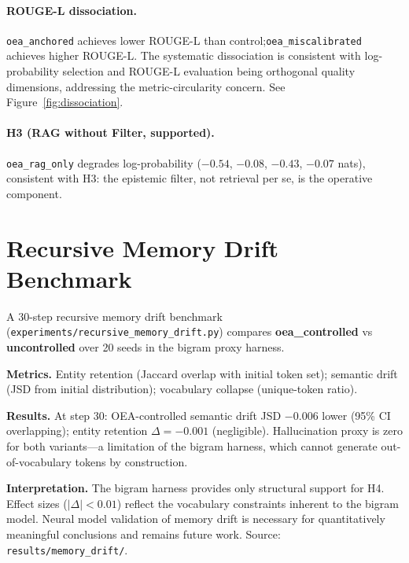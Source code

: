 \documentclass[11pt]{article}
\begin{document}
\paragraph{ROUGE-L dissociation.}
\texttt{oea\_anchored} achieves lower ROUGE-L than control;\linebreak[0] \texttt{oea\_miscalibrated} achieves higher ROUGE-L. The systematic dissociation is consistent with log-probability selection and ROUGE-L evaluation being orthogonal quality dimensions, addressing the metric-circularity concern. See Figure~\ref{fig:dissociation}.

\paragraph{H3 (RAG without Filter, supported).}
\texttt{oea\_rag\_only} degrades log-probability ($-0.54$, $-0.08$, $-0.43$, $-0.07$ nats), consistent with H3: the epistemic filter, not retrieval per se, is the operative component.

\section{Recursive Memory Drift Benchmark}
\label{sec:memorydrift}

A 30-step recursive memory drift benchmark (\texttt{experiments/recursive\_memory\_drift.py}) compares \textbf{oea\_controlled} vs \textbf{uncontrolled} over 20 seeds in the bigram proxy harness.

\textbf{Metrics.} Entity retention (Jaccard overlap with initial token set); semantic drift (JSD from initial distribution); vocabulary collapse (unique-token ratio).

\textbf{Results.} At step 30: OEA-controlled semantic drift JSD $-0.006$ lower (95\% CI overlapping); entity retention $\Delta = -0.001$ (negligible). Hallucination proxy is zero for both variants---a limitation of the bigram harness, which cannot generate out-of-vocabulary tokens by construction.

\textbf{Interpretation.} The bigram harness provides only structural support for H4. Effect sizes ($|\Delta| < 0.01$) reflect the vocabulary constraints inherent to the bigram model. Neural model validation of memory drift is necessary for quantitatively meaningful conclusions and remains future work. Source: \texttt{results/memory\_drift/}.

\end{document}
